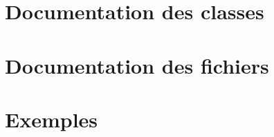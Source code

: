 \documentclass[twoside]{book}
\newcommand{\+}{\discretionary{\mbox{\scriptsize$\hookleftarrow$}}{}{}}
\newcommand{\clearemptydoublepage}{%
    \newpage{\pagestyle{empty}\cleardoublepage}%
  }
\begin{document}
\chapter{Documentation des classes}








\chapter{Documentation des fichiers}





















\chapter{Exemples}

  \backmatter
  \newpage
  \clearemptydoublepage
  \printindex
\end{document}
